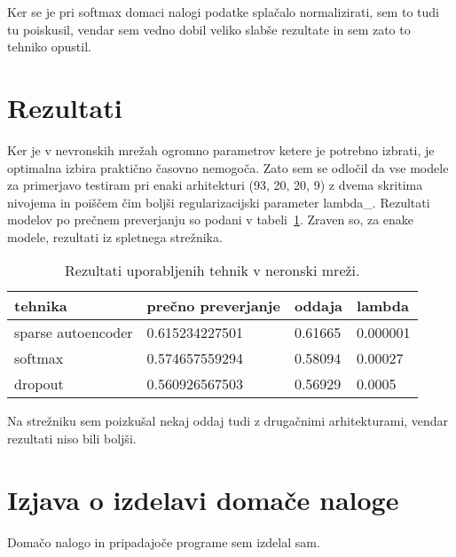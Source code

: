 \documentclass[a4paper,11pt]{article}
\begin{document}
Ker se je pri softmax domaci nalogi podatke splačalo normalizirati, sem to tudi tu poiskusil, vendar sem vedno dobil veliko slabše rezultate in sem zato to tehniko opustil.

\section{Rezultati}

Ker je v nevronskih mrežah ogromno parametrov ketere je potrebno izbrati, je optimalna izbira praktično časovno nemogoča. Zato sem se odločil da vse modele za primerjavo testiram pri enaki arhitekturi (93, 20, 20, 9) z dvema skritima nivojema in poiščem čim boljši regularizacijski parameter lambda\_. Rezultati modelov po prečnem preverjanju so podani v tabeli~\ref{tab1}. Zraven so, za enake modele, rezultati iz spletnega strežnika.

\begin{table}[htbp]
\caption{ Rezultati uporabljenih tehnik v neronski mreži. }
\label{tab1}
\begin{center}
\begin{tabular}{lllp{4cm}}
\hline
 tehnika & prečno preverjanje & oddaja & lambda \\
\hline
sparse autoencoder & 0.615234227501 & 0.61665 & 0.000001 \\
softmax & 0.574657559294 & 0.58094 & 0.00027‏ \\
dropout & 0.560926567503 & 0.56929 & 0.0005 \\
\hline
\end{tabular}
\end{center}
\end{table}

Na strežniku sem poizkušal nekaj oddaj tudi z drugačnimi arhitekturami, vendar rezultati niso bili boljši.

\section{Izjava o izdelavi domače naloge}
Domačo nalogo in pripadajoče programe sem izdelal sam.

\appendix
\appendixpage
\end{document}
